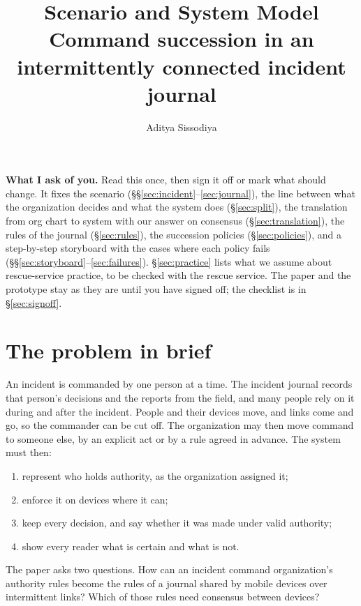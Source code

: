 \documentclass[11pt,a4paper]{article}
\title{\textbf{Scenario and System Model}\\[4pt]
\large Command succession in an intermittently connected incident journal}
\author{Aditya Sissodiya}
\date{}
\begin{document}
\maketitle
\thispagestyle{empty}

\noindent\colorbox{soft}{\parbox{\dimexpr\linewidth-2\fboxsep\relax}{\vspace{3pt}%
\textbf{What I ask of you.} Read this once, then sign it off or mark what should change.
It fixes the scenario (\S\S\ref{sec:incident}--\ref{sec:journal}), the line between what
the organization decides and what the system does (\S\ref{sec:split}), the translation
from org chart to system with our answer on consensus (\S\ref{sec:translation}), the rules
of the journal (\S\ref{sec:rules}), the succession policies (\S\ref{sec:policies}), and a
step-by-step storyboard with the cases where each policy fails
(\S\S\ref{sec:storyboard}--\ref{sec:failures}). \S\ref{sec:practice} lists what we assume
about rescue-service practice, to be checked with the rescue service. The paper and the
prototype stay as they are until you have signed off; the checklist is in
\S\ref{sec:signoff}.\vspace{3pt}}}

\section{The problem in brief}
\label{sec:problem}

An incident is commanded by one person at a time. The incident journal records that
person's decisions and the reports from the field, and many people rely on it during and
after the incident. People and their devices move, and links come and go, so the
commander can be cut off. The organization may then move command to someone else, by an
explicit act or by a rule agreed in advance. The system must then:
\begin{enumerate}
  \item represent who holds authority, as the organization assigned it;
  \item enforce it on devices where it can;
  \item keep every decision, and say whether it was made under valid authority;
  \item show every reader what is certain and what is not.
\end{enumerate}
The paper asks two questions. How can an incident command organization's authority rules
become the rules of a journal shared by mobile devices over intermittent links? Which of
those rules need consensus between devices?
\end{document}
